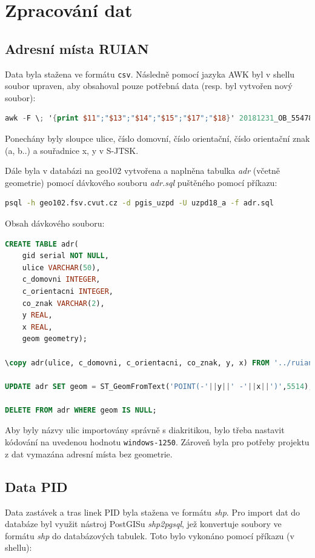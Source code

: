\documentclass[a4paper, 12pt]{article}
\begin{document}
\newpage
\section{Zpracování dat}
\subsection{Adresní místa RUIAN}
Data byla stažena ve formátu \texttt{csv}. Následně pomocí jazyka AWK byl v shellu soubor upraven, aby obsahoval pouze potřebná data (resp. byl vytvořen nový soubor):
\begin{lstlisting}[language=awk]
awk -F \; '{print $11";"$13";"$14";"$15";"$17";"$18}' 20181231_OB_554782_ADR.csv > ruian_adr.csv
\end{lstlisting}

Ponechány byly sloupce ulice, číslo domovní, číslo orientační, číslo orientační znak (a, b..) a souřadnice x, y v S-JTSK. 

Dále byla v databázi na geo102 vytvořena a naplněna tabulka \textit{adr} (včetně geometrie) pomocí dávkového souboru \textit{adr.sql} puštěného pomocí příkazu:

\begin{lstlisting}[language=bash]
psql -h geo102.fsv.cvut.cz -d pgis_uzpd -U uzpd18_a -f adr.sql	
\end{lstlisting}

Obsah dávkového souboru:

\begin{lstlisting}[language=sql]
CREATE TABLE adr(
	gid serial NOT NULL,
	ulice VARCHAR(50),
	c_domovni INTEGER,
	c_orientacni INTEGER,
	co_znak VARCHAR(2),
	y REAL,
	x REAL,
	geom geometry);
	
\copy adr(ulice, c_domovni, c_orientacni, co_znak, y, x) FROM '../ruian_adr.csv' DELIMITER ';' CSV HEADER encoding 'windows-1250';

UPDATE adr SET geom = ST_GeomFromText('POINT(-'||y||' -'||x||')',5514);

DELETE FROM adr WHERE geom IS NULL;

\end{lstlisting}

Aby byly názvy ulic importovány správně s diakritikou, bylo třeba nastavit kódování na uvedenou hodnotu \texttt{windows-1250}. Zároveň byla pro potřeby projektu z dat vymazána adresní místa bez geometrie.

\subsection{Data PID}
Data zastávek a tras linek PID byla stažena ve formátu \textit{shp}. Pro import dat do databáze byl využit nástroj PostGISu \textit{shp2pgsql}, jež konvertuje soubory ve formátu \textit{shp} do databázových tabulek. Toto bylo vykonáno pomocí příkazu (v shellu):
\end{document}

